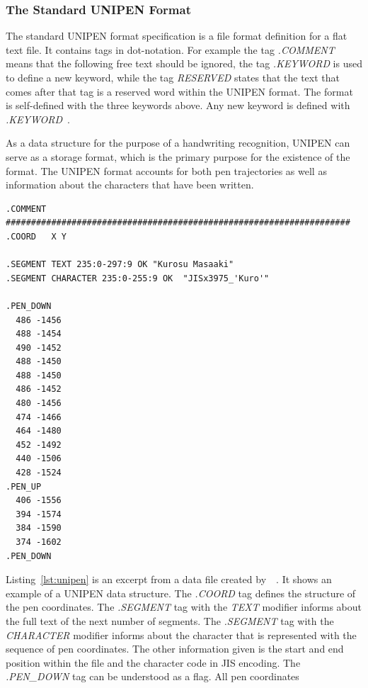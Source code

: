 \subsubsection{The Standard UNIPEN Format}
\label{sec:hwre:standardunipenformat}

The standard UNIPEN format specification is a file format definition for a flat
text file. It contains tags in dot-notation. For example the tag \emph{.COMMENT}
means that the following free text should be ignored, the tag \emph{.KEYWORD} 
is used to define a new keyword, while the tag \emph{RESERVED} states that
the text that comes after that tag is a reserved word within the UNIPEN format.
The format is self-defined with the three keywords above. Any new keyword is
defined with \emph{.KEYWORD}~.

As a data structure for the purpose of a handwriting recognition, UNIPEN can 
serve as a storage format, which is the primary purpose for the existence of the
format. The UNIPEN format accounts for both pen trajectories as well as 
information about the characters that have been written.
\begin{xmlcode}
  \begin{lstlisting}[emph={COMMENT,COORD,SEGMENT},emphstyle=\textbf,caption={Demonstration of the \emph{UNIPEN} format},label=lst:unipen]
.COMMENT #################################################################### 
.COORD   X Y

.SEGMENT TEXT 235:0-297:9 OK "Kurosu Masaaki"
.SEGMENT CHARACTER 235:0-255:9 OK  "JISx3975_'Kuro'"

.PEN_DOWN 
  486 -1456 
  488 -1454 
  490 -1452 
  488 -1450 
  488 -1450 
  486 -1452 
  480 -1456 
  474 -1466 
  464 -1480 
  452 -1492 
  440 -1506 
  428 -1524
.PEN_UP 
  406 -1556 
  394 -1574 
  384 -1590 
  374 -1602
.PEN_DOWN 
  \end{lstlisting}
\end{xmlcode}
Listing~\ref{lst:unipen} is an excerpt from a data file created 
by~~\citeyear{Unipen}. It shows an example of a UNIPEN data structure.
The \emph{.COORD} tag defines the structure of the pen coordinates. 
The \emph{.SEGMENT} tag with the \emph{TEXT} modifier informs about the
full text of the next number of segments. The \emph{.SEGMENT} tag with the
\emph{CHARACTER} modifier informs about the character that is represented
with the sequence of pen coordinates. The other information given is the
start and end position within the file and the character code in JIS encoding.
The \emph{.PEN\_DOWN} tag can be understood as a flag. All pen coordinates 
